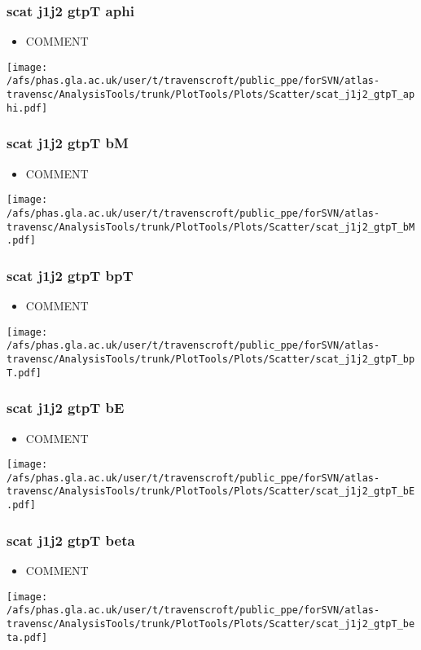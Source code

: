 \documentclass{beamer}
\begin{document}
\begin{frame}
\frametitle{scat j1j2 gtpT aphi}
\begin{itemize}
\item COMMENT
\end{itemize}
\begin{center}
\texttt{[image: /afs/phas.gla.ac.uk/user/t/travenscroft/public\_ppe/forSVN/atlas-travensc/AnalysisTools/trunk/PlotTools/Plots/Scatter/scat\_j1j2\_gtpT\_aphi.pdf]}
\end{center}
\end{frame}

\begin{frame}
\frametitle{scat j1j2 gtpT bM}
\begin{itemize}
\item COMMENT
\end{itemize}
\begin{center}
\texttt{[image: /afs/phas.gla.ac.uk/user/t/travenscroft/public\_ppe/forSVN/atlas-travensc/AnalysisTools/trunk/PlotTools/Plots/Scatter/scat\_j1j2\_gtpT\_bM.pdf]}
\end{center}
\end{frame}

\begin{frame}
\frametitle{scat j1j2 gtpT bpT}
\begin{itemize}
\item COMMENT
\end{itemize}
\begin{center}
\texttt{[image: /afs/phas.gla.ac.uk/user/t/travenscroft/public\_ppe/forSVN/atlas-travensc/AnalysisTools/trunk/PlotTools/Plots/Scatter/scat\_j1j2\_gtpT\_bpT.pdf]}
\end{center}
\end{frame}

\begin{frame}
\frametitle{scat j1j2 gtpT bE}
\begin{itemize}
\item COMMENT
\end{itemize}
\begin{center}
\texttt{[image: /afs/phas.gla.ac.uk/user/t/travenscroft/public\_ppe/forSVN/atlas-travensc/AnalysisTools/trunk/PlotTools/Plots/Scatter/scat\_j1j2\_gtpT\_bE.pdf]}
\end{center}
\end{frame}

\begin{frame}
\frametitle{scat j1j2 gtpT beta}
\begin{itemize}
\item COMMENT
\end{itemize}
\begin{center}
\texttt{[image: /afs/phas.gla.ac.uk/user/t/travenscroft/public\_ppe/forSVN/atlas-travensc/AnalysisTools/trunk/PlotTools/Plots/Scatter/scat\_j1j2\_gtpT\_beta.pdf]}
\end{center}
\end{frame}
\end{document}

